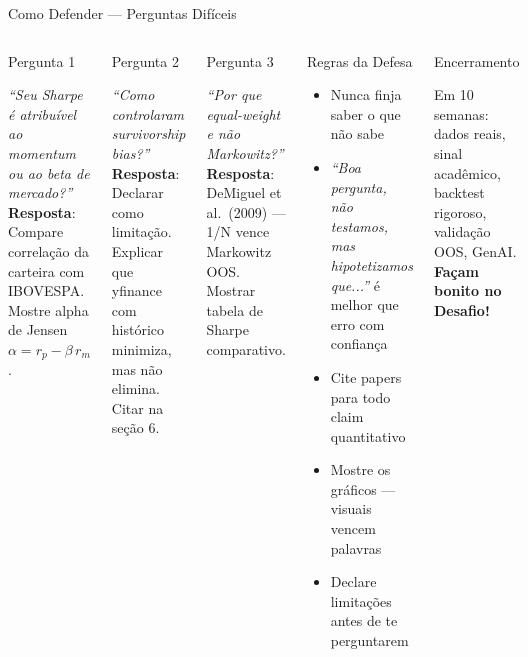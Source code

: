 \documentclass[aspectratio=169,12pt]{beamer}
\begin{document}
\begin{frame}[fragile]{Como Defender — Perguntas Difíceis}
\begin{columns}[T]
\begin{block}{Pergunta 1}

\textit{``Seu Sharpe é atribuível ao momentum ou ao beta de mercado?''}\\[.3em]
\textbf{Resposta}: Compare correlação da carteira com IBOVESPA. Mostre alpha de Jensen $\alpha = r_p - \beta\,r_m$.

\end{block}\vspace{.3em}
\begin{block}{Pergunta 2}

\textit{``Como controlaram survivorship bias?''}\\[.3em]
\textbf{Resposta}: Declarar como limitação. Explicar que yfinance com histórico minimiza, mas não elimina. Citar na seção 6.

\end{block}\vspace{.3em}
\begin{block}{Pergunta 3}

\textit{``Por que equal-weight e não Markowitz?''}\\[.3em]
\textbf{Resposta}: DeMiguel et al.\ (2009) — 1/N vence Markowitz OOS. Mostrar tabela de Sharpe comparativo.

\end{block}
\begin{block}{Regras da Defesa}
\begin{itemize}
  \item Nunca finja saber o que não sabe
  \item \textit{``Boa pergunta, não testamos, mas hipotetizamos que...''} é melhor que erro com confiança
  \item Cite papers para todo claim quantitativo
  \item Mostre os gráficos — visuais vencem palavras
  \item Declare limitações antes de te perguntarem
\end{itemize}
\end{block}\vspace{.3em}
\begin{exampleblock}{Encerramento}

Em 10 semanas: dados reais, sinal acadêmico, backtest rigoroso, validação OOS, GenAI.
\textbf{Façam bonito no Desafio!}
\end{exampleblock}
\end{columns}
\end{frame}
\end{document}
